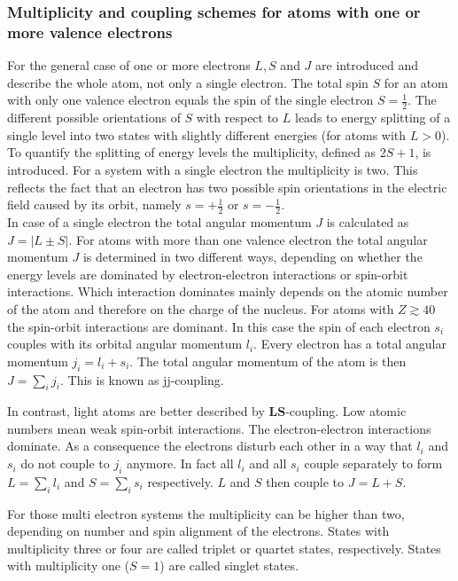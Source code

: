 \documentclass[parskip,12pt,headsepline,a4paper] {scrbook}
\begin{document}
\subsubsection{Multiplicity and coupling schemes for atoms with one or more valence electrons}
\vspace{-1\baselineskip}
For the general case of one or more electrons $L, S$ and $J$ are introduced and describe the whole atom, not only a single electron. The total spin $S$ for an atom with only one valence electron equals the spin of the single electron $S = \frac{1}{2}$. The different possible orientations of $S$ with respect to $L$ leads to energy splitting of a single level into two states with slightly different energies (for atoms with $L > 0$). To quantify the splitting of energy levels the multiplicity, defined as $2S + 1$, is introduced. For a system with a single electron the multiplicity is two. This reflects the fact that an electron has two possible spin orientations in the electric field caused by its orbit, namely $s = +\frac{1}{2}$ or $s = -\frac{1}{2}$. \\
In case of a single electron the total angular momentum $J$ is calculated as $J = |L \pm S|$. For atoms with more than one valence electron the total angular momentum $J$ is determined in two different ways, depending on whether the energy levels are dominated by electron-electron interactions or spin-orbit interactions. Which interaction dominates mainly depends on the atomic number of the atom and therefore on the charge of the nucleus. For atoms with $Z \gtrsim 40$ the spin-orbit interactions are dominant. In this case the spin of each electron $s_i$ couples with its orbital angular momentum $l_i$. Every electron has a total angular momentum $j_i = l_i + s_i$. The total angular momentum of the atom is then $J = \sum\limits_{i} j_i$. This is known as jj-coupling.

In contrast, light atoms are better described by $\mathbf{LS}$-coupling. Low atomic numbers mean weak spin-orbit interactions. The electron-electron interactions dominate. As a consequence the electrons disturb each other in a way that $l_i$ and $s_i$ do not couple to $j_i$ anymore. In fact all $l_i$ and all $s_i$ couple separately to form $L = \sum\limits_{i} l_i$ and $S = \sum\limits_{i} s_i$ respectively. $L$ and $S$ then couple to $J = L + S$.

For those multi electron systems the multiplicity can be higher than two, depending on number and spin alignment of the electrons. States with multiplicity three or four are called triplet or quartet states, respectively. States with multiplicity one ($S = 1$) are called singlet states.
\end{document}
